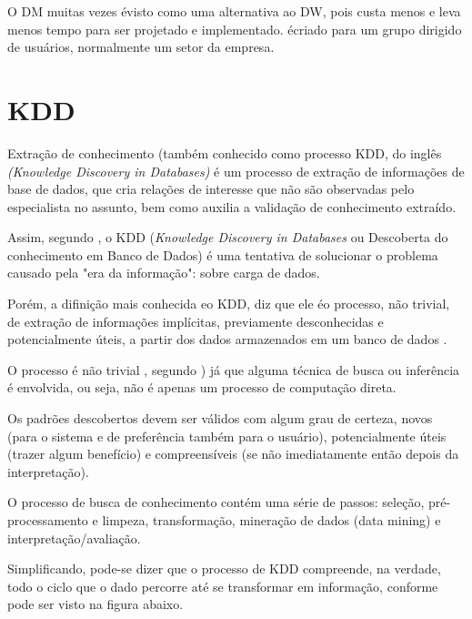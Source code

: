 O DM muitas vezes \'{e}visto como uma alternativa ao DW, pois custa menos e leva menos tempo para ser projetado e implementado. \'{e}criado para um grupo dirigido de usu\'{a}rios, normalmente um setor da empresa.

\section{KDD}

Extra\c{c}\~{a}o de conhecimento (tamb\'{e}m conhecido como processo KDD, do ingl\^{e}s 
\textit{(Knowledge Discovery in Databases)} \'{e} um processo de extra\c{c}\~{a}o de informa\c{c}\~{o}es de base de dados, que cria rela\c{c}\~{o}es de interesse que n\~{a}o s\~{a}o observadas pelo especialista no assunto, bem como auxilia a valida\c{c}\~{a}o de conhecimento extra\'{i}do.

Assim, segundo \cite{kdd-fayyad}, o KDD (\textit{Knowledge Discovery in Databases} ou Descoberta do conhecimento em Banco de Dados) \'{e} uma tentativa de solucionar o problema causado pela "era da informa\c{c}\~{a}o": sobre carga de dados.

Por\'{e}m, a difini\c{c}\~{a}o mais conhecida eo KDD, diz que ele \'{e}o processo, n\~{a}o trivial, de extra\c{c}\~{a}o de informa\c{c}\~{o}es impl\'{i}citas, previamente desconhecidas e potencialmente úteis, a partir dos dados armazenados em um banco de dados \cite{kdd-fayyad}.

O processo \'{e} n\~{a}o trivial , segundo \cite{kdd-fayyad}) j\'{a} que alguma t\'{e}cnica de busca ou infer\^{e}ncia \'{e} envolvida, ou seja, n\~{a}o \'{e} apenas um processo de computa\c{c}\~{a}o direta. 

Os padr\~{o}es descobertos devem ser v\'{a}lidos com algum grau de certeza, novos (para o sistema e de prefer\^{e}ncia tamb\'{e}m para o usu\'{a}rio), potencialmente úteis (trazer algum benef\'{i}cio) e compreens\'{i}veis (se n\~{a}o imediatamente ent\~{a}o depois da interpreta\c{c}\~{a}o).

O processo de busca de conhecimento cont\'{e}m uma s\'{e}rie de passos: sele\c{c}\~{a}o, pr\'{e}-processamento e limpeza, transforma\c{c}\~{a}o, minera\c{c}\~{a}o de dados (data mining) e interpreta\c{c}\~{a}o/avalia\c{c}\~{a}o. 

Simplificando, pode-se dizer que o processo de KDD compreende, na verdade, todo o ciclo que o dado percorre at\'{e} se transformar em informa\c{c}\~{a}o, conforme pode ser visto na figura abaixo.

